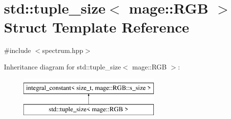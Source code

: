 \hypertarget{structstd_1_1tuple__size_3_01mage_1_1_r_g_b_01_4}{}\section{std\+:\+:tuple\+\_\+size$<$ mage\+:\+:R\+GB $>$ Struct Template Reference}
\label{structstd_1_1tuple__size_3_01mage_1_1_r_g_b_01_4}


{\ttfamily \#include $<$spectrum.\+hpp$>$}

Inheritance diagram for std\+:\+:tuple\+\_\+size$<$ mage\+:\+:R\+GB $>$\+:\begin{figure}[H]
\begin{center}
\leavevmode
\includegraphics[height=2.000000cm]{structstd_1_1tuple__size_3_01mage_1_1_r_g_b_01_4}
\end{center}
\end{figure}
